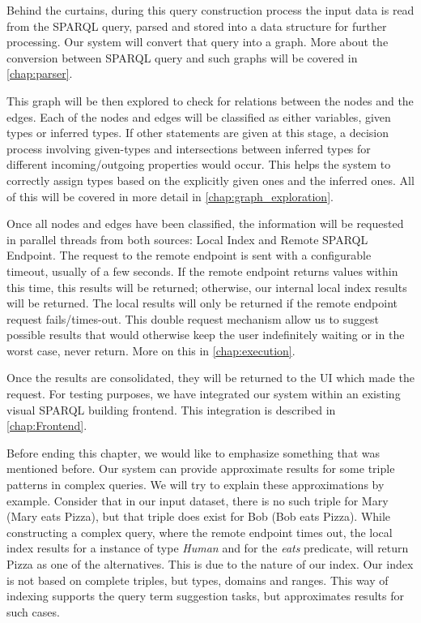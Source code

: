 Behind the curtains, during this query construction process the input data is read from the SPARQL query, parsed and stored into a data structure for further processing. 
Our system will convert that query into a graph. 
More about the conversion between SPARQL query and such graphs will be covered in \autoref{chap:parser}.

This graph will be then explored to check for relations between the nodes and the edges. 
Each of the nodes and edges will be classified as either variables, given types or inferred types. 
If other statements are given at this stage, a decision process involving given-types and intersections between inferred types for different incoming/outgoing properties would occur. 
This helps the system to correctly assign types based on the explicitly given ones and the inferred ones. 
All of this will be covered in more detail in \autoref{chap:graph_exploration}.

Once all nodes and edges have been classified, the information will be requested in parallel threads from both sources: 
Local Index and Remote SPARQL Endpoint. 
The request to the remote endpoint is sent with a configurable timeout, usually of a few seconds. 
If the remote endpoint returns values within this time, this results will be returned; otherwise, our internal local index results will be returned. The local results will only be returned if the remote endpoint request fails/times-out. 
This double request mechanism allow us to suggest possible results that would otherwise keep the user indefinitely waiting or in the worst case, never return. 
More on this in \autoref{chap:execution}.

Once the results are consolidated, they will be returned to the UI which made the request. 
For testing purposes, we have integrated our system within an existing visual SPARQL building frontend. 
This integration is described in \autoref{chap:Frontend}.

Before ending this chapter, we would like to emphasize something that was mentioned before. 
Our system can provide approximate results for some triple patterns in complex queries. 
We will try to explain these approximations by example. 
Consider that in our input dataset, there is no such triple for Mary (Mary eats Pizza), but that triple does exist for Bob (Bob eats Pizza). 
While constructing a complex query, where the remote endpoint times out, the local index results for a instance of type \textit{Human} and for the \textit{eats} predicate, will return Pizza as one of the alternatives.
This is due to the nature of our index.
Our index is not based on complete triples, but types, domains and ranges.
This way of indexing supports the query term suggestion tasks, but approximates results for such cases.